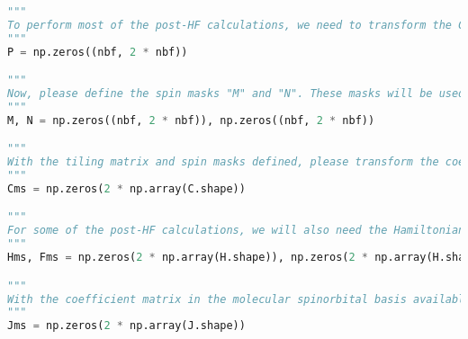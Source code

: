 \raggedbottom\begin{lstlisting}[language=Python, caption={Integral transform exercise code. The tiling matrices are predefined here with a correct shape, but the student is expected to fill the with the correct expressions. After that, the student should transform the coefficient matrix, core Hamoltonian, Fock matrix and two-electron integrals to the \acrshort{ms} basis. Additionally, orbital energy tensor are also expected to be calculated.}, label=code:int_exercise]
"""
To perform most of the post-HF calculations, we need to transform the Coulomb integrals to the molecular spinorbital basis, so if you don't plan to calculate any post-HF methods, you can end the eercise here. The restricted MP2 calculation could be done using the Coulomb integral in MO basis, but for the sake of subsequent calculations, we enforce here the integrals in the MS basis. The first thing you will need for the transform is the coefficient matrix in the molecular spinorbital basis. To perform this transform using the mathematical formulation presented in the materials, the first step is to form the tiling matrix "P" which will be used to duplicate columns of a general matrix. Please define it here.
"""
P = np.zeros((nbf, 2 * nbf))

"""
Now, please define the spin masks "M" and "N". These masks will be used to zero out spinorbitals, that should be empty.
"""
M, N = np.zeros((nbf, 2 * nbf)), np.zeros((nbf, 2 * nbf))

"""
With the tiling matrix and spin masks defined, please transform the coefficient matrix into the molecular spinorbital basis. The resulting matrix should be stored in the "Cms" variable.
"""
Cms = np.zeros(2 * np.array(C.shape))

"""
For some of the post-HF calculations, we will also need the Hamiltonian and Fock matrix in the molecular spinorbital basis. Please transform it and store it in the "Hms" and "Fms" variable. If you don't plan to calculate the CCSD method, you can skip the transformation of the Fock matrix, as it is not needed for the MP2 and CI calculations.
"""
Hms, Fms = np.zeros(2 * np.array(H.shape)), np.zeros(2 * np.array(H.shape))

"""
With the coefficient matrix in the molecular spinorbital basis available, we can proceed to transform the Coulomb integrals. It is important to note that the transformed integrals will contain twice as many elements along each axis compared to their counterparts in the atomic orbital (AO) basis. This increase is due to the representation of both spin states in the molecular spinorbital basis.
"""
Jms = np.zeros(2 * np.array(J.shape))


\end{lstlisting}
